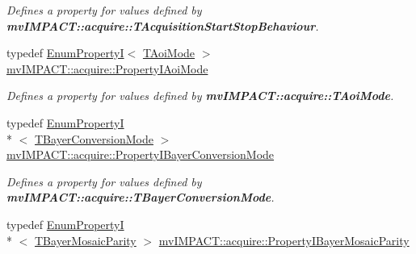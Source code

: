 \begin{DoxyCompactItemize}
\begin{DoxyCompactList}\small\item\em Defines a property for values defined by {\bfseries mv\+I\+M\+P\+A\+C\+T\+::acquire\+::\+T\+Acquisition\+Start\+Stop\+Behaviour}. \end{DoxyCompactList}\item 
\hypertarget{group___common_interface_gac29dd0ca928e4e97eeb1a038ddb4f2af}{typedef \hyperlink{classmv_i_m_p_a_c_t_1_1acquire_1_1_enum_property_i}{Enum\+Property\+I}$<$ \hyperlink{group___common_interface_gae7940d967323243f7d4ebdb5cc8045cb}{T\+Aoi\+Mode} $>$ \hyperlink{group___common_interface_gac29dd0ca928e4e97eeb1a038ddb4f2af}{mv\+I\+M\+P\+A\+C\+T\+::acquire\+::\+Property\+I\+Aoi\+Mode}}\label{group___common_interface_gac29dd0ca928e4e97eeb1a038ddb4f2af}

\begin{DoxyCompactList}\small\item\em Defines a property for values defined by {\bfseries mv\+I\+M\+P\+A\+C\+T\+::acquire\+::\+T\+Aoi\+Mode}. \end{DoxyCompactList}\item 
\hypertarget{group___common_interface_ga0420d9b31df0caf0bc62286439e80366}{typedef \hyperlink{classmv_i_m_p_a_c_t_1_1acquire_1_1_enum_property_i}{Enum\+Property\+I}\\*
$<$ \hyperlink{group___common_interface_gab19b45fcaaa584be84a99a3d7098b055}{T\+Bayer\+Conversion\+Mode} $>$ \hyperlink{group___common_interface_ga0420d9b31df0caf0bc62286439e80366}{mv\+I\+M\+P\+A\+C\+T\+::acquire\+::\+Property\+I\+Bayer\+Conversion\+Mode}}\label{group___common_interface_ga0420d9b31df0caf0bc62286439e80366}

\begin{DoxyCompactList}\small\item\em Defines a property for values defined by {\bfseries mv\+I\+M\+P\+A\+C\+T\+::acquire\+::\+T\+Bayer\+Conversion\+Mode}. \end{DoxyCompactList}\item 
\hypertarget{group___common_interface_gafaa3668c30761b139d7ff110ac2c83e4}{typedef \hyperlink{classmv_i_m_p_a_c_t_1_1acquire_1_1_enum_property_i}{Enum\+Property\+I}\\*
$<$ \hyperlink{group___common_interface_ga9e2a1b46f3ed21b46b867c6d88d25598}{T\+Bayer\+Mosaic\+Parity} $>$ \hyperlink{group___common_interface_gafaa3668c30761b139d7ff110ac2c83e4}{mv\+I\+M\+P\+A\+C\+T\+::acquire\+::\+Property\+I\+Bayer\+Mosaic\+Parity}}\label{group___common_interface_gafaa3668c30761b139d7ff110ac2c83e4}


\end{DoxyCompactItemize}
